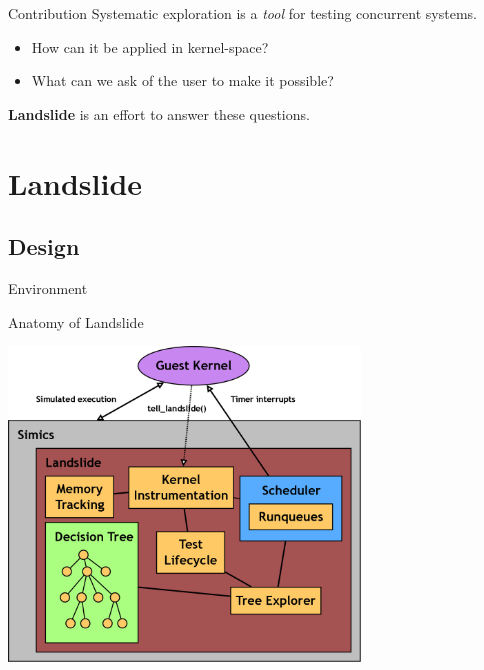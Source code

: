 \documentclass[xcolor=dvipsnames]{beamer}
\begin{document}
\begin{frame}{Contribution} %
	Systematic exploration is a {\em tool} for testing concurrent systems.
	\begin{itemize}
		\item How can it be applied in kernel-space?
		\item What can we ask of the user to make it possible?
	\end{itemize}
	\linegap

	{\bf Landslide} is an effort to answer these questions.
\end{frame}

\section{Landslide}


\subsection{Design}

\begin{frame}{Environment}
\end{frame}

\begin{frame}{Anatomy of Landslide}
	\begin{center}
	\includegraphics[width=0.7\textwidth]{landslide.png}
	\end{center}
\end{frame}
\end{document}
